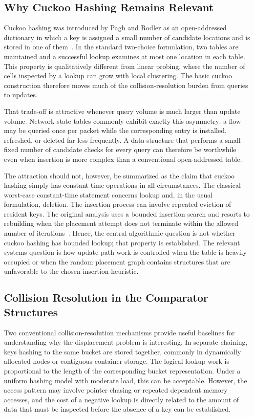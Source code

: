 \documentclass[conference]{IEEEtran}
\begin{document}
\subsection{Why Cuckoo Hashing Remains Relevant}

Cuckoo hashing was introduced by Pagh and Rodler as an open-addressed dictionary in which a key is assigned a small number of candidate locations and is stored in one of them~\cite{pagh2004cuckoo}. In the standard two-choice formulation, two tables are maintained and a successful lookup examines at most one location in each table. This property is qualitatively different from linear probing, where the number of cells inspected by a lookup can grow with local clustering. The basic cuckoo construction therefore moves much of the collision-resolution burden from queries to updates.

That trade-off is attractive whenever query volume is much larger than update volume. Network state tables commonly exhibit exactly this asymmetry: a flow may be queried once per packet while the corresponding entry is installed, refreshed, or deleted far less frequently. A data structure that performs a small fixed number of candidate checks for every query can therefore be worthwhile even when insertion is more complex than a conventional open-addressed table.

The attraction should not, however, be summarized as the claim that cuckoo hashing simply has constant-time operations in all circumstances. The classical worst-case constant-time statement concerns lookup and, in the usual formulation, deletion. The insertion process can involve repeated eviction of resident keys. The original analysis uses a bounded insertion search and resorts to rebuilding when the placement attempt does not terminate within the allowed number of iterations~\cite{pagh2004cuckoo}. Hence, the central algorithmic question is not whether cuckoo hashing has bounded lookup; that property is established. The relevant systems question is how update-path work is controlled when the table is heavily occupied or when the random placement graph contains structures that are unfavorable to the chosen insertion heuristic.

\subsection{Collision Resolution in the Comparator Structures}

Two conventional collision-resolution mechanisms provide useful baselines for understanding why the displacement problem is interesting. In separate chaining, keys hashing to the same bucket are stored together, commonly in dynamically allocated nodes or contiguous container storage. The logical lookup work is proportional to the length of the corresponding bucket representation. Under a uniform hashing model with moderate load, this can be acceptable. However, the access pattern may involve pointer chasing or repeated dependent memory accesses, and the cost of a negative lookup is directly related to the amount of data that must be inspected before the absence of a key can be established.
\end{document}
